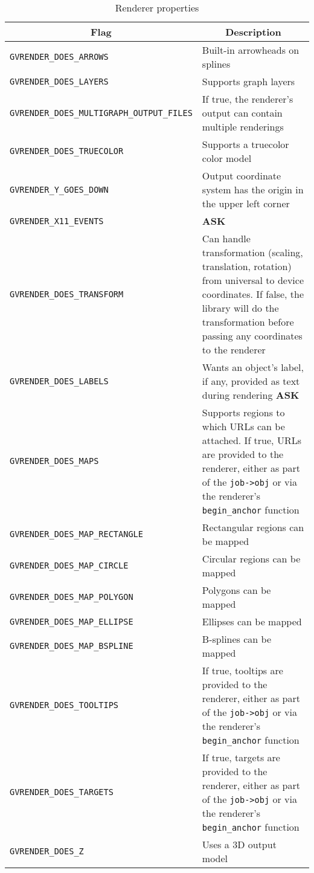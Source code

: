 \begin{table*}[htbp]\footnotesize
\centering
\begin{tabular}[t]{|l|p{3.5in}|} \hline
\multicolumn{1}{|c|}{Flag} & \multicolumn{1}{c|}{Description} \\ \hline
{\tt GVRENDER\_DOES\_ARROWS} & Built-in arrowheads on splines \\
{\tt GVRENDER\_DOES\_LAYERS} & Supports graph layers \\
{\tt GVRENDER\_DOES\_MULTIGRAPH\_OUTPUT\_FILES} & If true, the renderer's
output can contain multiple renderings \\
{\tt GVRENDER\_DOES\_TRUECOLOR} & Supports a truecolor color model \\
{\tt GVRENDER\_Y\_GOES\_DOWN} & Output coordinate system has the origin in
the upper left corner \\
{\tt GVRENDER\_X11\_EVENTS} & {\bf ASK} \\
{\tt GVRENDER\_DOES\_TRANSFORM} & Can handle transformation (scaling,
translation, rotation) from universal
to device coordinates. If false, the library will do the transformation
before passing any coordinates to the renderer \\
{\tt GVRENDER\_DOES\_LABELS} & Wants an object's label, if any, provided 
as text during rendering {\bf ASK} \\
{\tt GVRENDER\_DOES\_MAPS} & Supports regions to which URLs can be attached.
If true, URLs are provided to the renderer, 
either as part of the {\tt job->obj} or via the renderer's {\tt begin\_anchor}
function \\
{\tt GVRENDER\_DOES\_MAP\_RECTANGLE} & Rectangular regions can be mapped \\
{\tt GVRENDER\_DOES\_MAP\_CIRCLE} & Circular regions can be mapped \\
{\tt GVRENDER\_DOES\_MAP\_POLYGON} & Polygons can be mapped \\
{\tt GVRENDER\_DOES\_MAP\_ELLIPSE} & Ellipses can be mapped \\
{\tt GVRENDER\_DOES\_MAP\_BSPLINE} & B-splines can be mapped \\
{\tt GVRENDER\_DOES\_TOOLTIPS} & If true, tooltips are provided to the renderer,
either as part of the {\tt job->obj} or via the renderer's {\tt begin\_anchor}
function \\
{\tt GVRENDER\_DOES\_TARGETS} & If true, targets are provided to the renderer, 
either as part of the {\tt job->obj} or via the renderer's {\tt begin\_anchor}
function \\
{\tt GVRENDER\_DOES\_Z} & Uses a 3D output model \\
\hline
\end{tabular}
\caption{Renderer properties}
\label{table:renderflags}
\end{table*}

